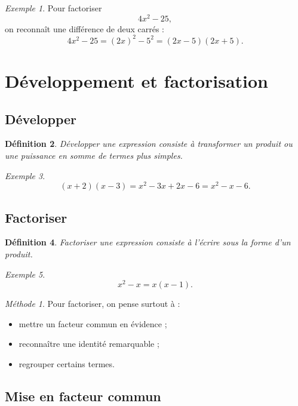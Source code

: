 \documentclass[11pt,a4paper]{article}
\newtheorem{definition}{Définition}[section]
\theoremstyle{remark}
\newtheorem{exemple}[definition]{Exemple}
\newtheorem*{methode}{Méthode}
\begin{document}
\begin{exemple}
Pour factoriser
\[
4x^2-25,
\]
on reconnaît une différence de deux carrés :
\[
4x^2-25=(2x)^2-5^2=(2x-5)(2x+5).
\]
\end{exemple}

\section{Développement et factorisation}

\subsection{Développer}

\begin{definition}
Développer une expression consiste à transformer un produit ou une puissance en somme de termes plus simples.
\end{definition}

\begin{exemple}
\[
(x+2)(x-3)=x^2-3x+2x-6=x^2-x-6.
\]
\end{exemple}

\subsection{Factoriser}

\begin{definition}
Factoriser une expression consiste à l’écrire sous la forme d’un produit.
\end{definition}

\begin{exemple}
\[
x^2-x=x(x-1).
\]
\end{exemple}

\begin{methode}
Pour factoriser, on pense surtout à :
\begin{itemize}
    \item mettre un facteur commun en évidence ;
    \item reconnaître une identité remarquable ;
    \item regrouper certains termes.
\end{itemize}
\end{methode}

\subsection{Mise en facteur commun}
\end{document}
